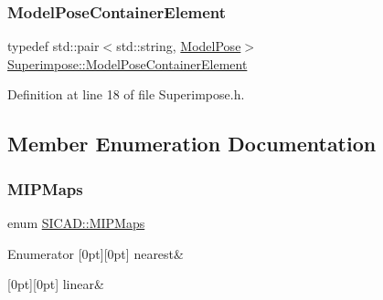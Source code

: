 \subsubsection{\texorpdfstring{Model\+Pose\+Container\+Element}{ModelPoseContainerElement}}
{\footnotesize\ttfamily typedef std\+::pair$<$std\+::string, \mbox{\hyperlink{classSuperimpose_a85d40a5caf19f486d1e0c15c0a025378}{Model\+Pose}}$>$ \mbox{\hyperlink{classSuperimpose_a1e02e0225687b42296dcfee4eadf8a55}{Superimpose\+::\+Model\+Pose\+Container\+Element}}\hspace{0.3cm}{\ttfamily [inherited]}}



Definition at line 18 of file Superimpose.\+h.



\subsection{Member Enumeration Documentation}
\mbox{\label{classSICAD_a7e092dede6f660355462d6d548214198}} 
\subsubsection{\texorpdfstring{M\+I\+P\+Maps}{MIPMaps}}
{\footnotesize\ttfamily enum \mbox{\hyperlink{classSICAD_a7e092dede6f660355462d6d548214198}{S\+I\+C\+A\+D\+::\+M\+I\+P\+Maps}}\hspace{0.3cm}{\ttfamily [strong]}}

\begin{DoxyEnumFields}{Enumerator}
[0pt][0pt]{}\mbox{\label{classSICAD_a7e092dede6f660355462d6d548214198ad879c351426770bc0b13c3628db1e636}} 
nearest&\\
\hline

[0pt][0pt]{}\mbox{\label{classSICAD_a7e092dede6f660355462d6d548214198a9a932b3cb396238423eb2f33ec17d6aa}} 
linear&\\
\hline

\end{DoxyEnumFields}


